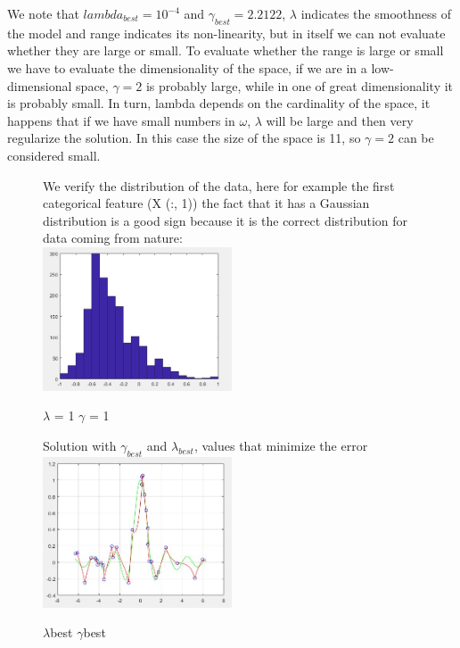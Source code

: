 We note that $lambda_{best} = 10^{-4}$ and $\gamma_{best} = 2.2122$, $\lambda$ indicates the smoothness of the model and range indicates its non-linearity, but in itself we can not evaluate whether they are large or small.
To evaluate whether the range is large or small we have to evaluate the dimensionality of the space, if we are in a low-dimensional space, $\gamma = 2$ is probably large, while in one of great dimensionality it is probably small. In turn, lambda depends on the cardinality of the space, it happens that if we have small numbers in $\omega$, $\lambda$ will be large and then very regularize the solution.
In this case the size of the space is 11, so $\gamma = 2$ can be considered small.\\
\begin{figure}
We verify the distribution of the data, here for example the first categorical feature (X (:, 1)) the fact that it has a Gaussian distribution is a good sign because it is the correct distribution for data coming from nature:\\
	
	\includegraphics[width=0.5\textwidth]{hist1.png}
	\centering
	\caption{$\lambda$ = 1 $\gamma$ = 1}
	\label{fig:\lambda = 1 \gamma = 1}

	
\end{figure}

\begin{figure}

Solution with $\gamma_{best}$ and $\lambda_{best}$, values that minimize the error\\

	\includegraphics[width=0.5\textwidth]{kmlbgb.png}
	\centering
	\caption{$\lambda$best $\gamma$best}
	
	
\end{figure}

